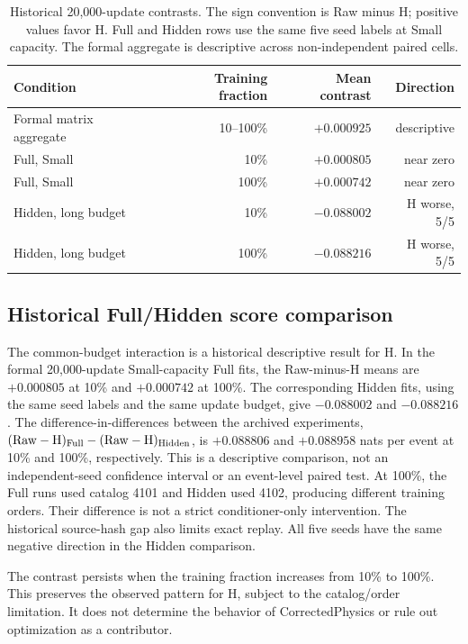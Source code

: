 \documentclass[11pt]{article}
\newcommand{\raw}{\mathrm{Raw}}
\begin{document}
\begin{table}[t]
\centering
\caption{Historical 20,000-update contrasts. The sign convention is Raw minus
H; positive values favor H. Full and Hidden rows use the same five
seed labels at Small capacity. The formal aggregate is descriptive across
non-independent paired cells.}
\label{tab:contrasts}
\begin{tabular}{lrrr}
\toprule
Condition & Training fraction & Mean contrast & Direction \\
\midrule
Formal matrix aggregate & 10--100\% & $+0.000925$ & descriptive \\
Full, Small & 10\% & $+0.000805$ & near zero \\
Full, Small & 100\% & $+0.000742$ & near zero \\
Hidden, long budget & 10\% & $-0.088002$ & H worse, 5/5 \\
Hidden, long budget & 100\% & $-0.088216$ & H worse, 5/5 \\
\bottomrule
\end{tabular}
\end{table}

\subsection{Historical Full/Hidden score comparison}

The common-budget interaction is a historical descriptive result for H. In the formal
20,000-update Small-capacity Full fits, the Raw-minus-H means are
$+0.000805$ at 10\% and $+0.000742$ at 100\%. The corresponding Hidden fits,
using the same seed labels and the same update budget, give $-0.088002$ and
$-0.088216$. The difference-in-differences between the archived experiments,
$(\raw-\mathrm{H})_{\rm Full}-(\raw-\mathrm{H})_{\rm Hidden}$, is $+0.088806$ and
$+0.088958$ nats per event at 10\% and 100\%, respectively. This is a
descriptive comparison, not an independent-seed confidence interval or an
event-level paired test. At 100\%, the Full runs used catalog 4101 and Hidden
used 4102, producing different training orders. Their difference is not a
strict conditioner-only intervention. The historical source-hash gap also
limits exact replay. All five seeds have the same negative direction in the
Hidden comparison.

The contrast persists when the training fraction increases from 10\% to 100\%.
This preserves the observed pattern for H, subject to the catalog/order
limitation. It does not determine the behavior of CorrectedPhysics or rule out
optimization as a contributor.
\end{document}

